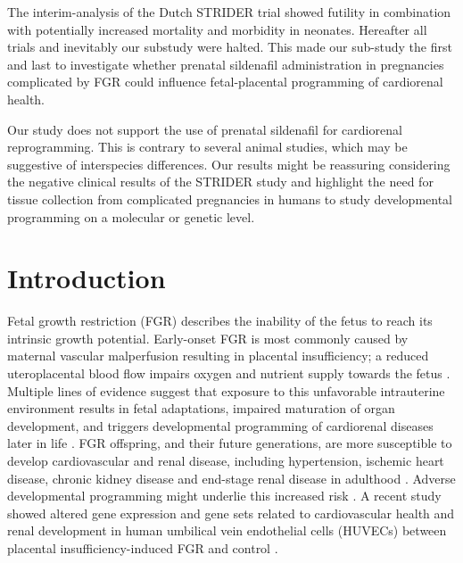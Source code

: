 \documentclass[authordate, empirical]{jote-new-article}
\begin{document}
	The interim-analysis of the Dutch STRIDER trial showed futility in combination with potentially increased mortality and morbidity in neonates. Hereafter all trials and inevitably our substudy were halted. This made our sub-study the first and last to investigate whether prenatal sildenafil administration in pregnancies complicated by FGR could influence fetal-placental programming of cardiorenal health.







	Our study does not support the use of prenatal sildenafil for cardiorenal reprogramming. This is contrary to several animal studies, which may be suggestive of interspecies differences. Our results might be reassuring considering the negative clinical results of the STRIDER study and highlight the need for tissue collection from complicated pregnancies in humans to study developmental programming on a molecular or genetic level.



	\section{Introduction}







	Fetal growth restriction (FGR) describes the inability of the fetus to reach its intrinsic growth potential. Early-onset FGR is most commonly caused by maternal vascular malperfusion resulting in placental insufficiency; a reduced uteroplacental blood flow impairs oxygen and nutrient supply towards the fetus \parencites{Burton2018}. Multiple lines of evidence suggest that exposure to this unfavorable intrauterine environment results in fetal adaptations, impaired maturation of organ development, and triggers developmental programming of cardiorenal diseases later in life \parencites{Barker2006}{Sundrani2017}{Chen2012}{Henriksen2002}. FGR offspring, and their future generations, are more susceptible to develop cardiovascular and renal disease, including hypertension, ischemic heart disease, chronic kidney disease and end-stage renal disease in adulthood \parencites{Malhotra2019}{White2009}{Gjerde2020}{Kooiman2020}{Demicheva2014}{Dötsch2016}{Sehgal2020}{Nüsken2020}. Adverse developmental programming might underlie this increased risk \parencites{Sehgal2020}{Nüsken2020}. A recent study showed altered gene expression and gene sets related to cardiovascular health and renal development in human umbilical vein endothelial cells (HUVECs) between placental insufficiency-induced FGR and control \parencites{Terstappen2020}.
\end{document}
